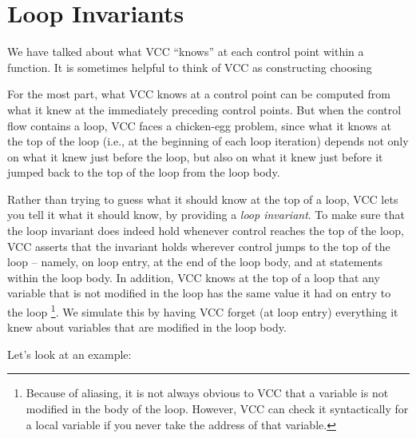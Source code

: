 \section{Loop Invariants}

We have talked about what VCC ``knows'' at each control point within a
function. It is sometimes helpful to think of VCC as constructing
choosing 


For the most part, what VCC knows at a control point can be
computed from what it knew at the immediately preceding control
points. But when the control flow contains a loop, VCC faces a
chicken-egg problem, since what it knows at the top of the loop (i.e.,
at the beginning of each loop iteration) depends not only on what it
knew just before the loop, but also on what it knew just before it
jumped back to the top of the loop from the loop body.

Rather than trying to guess what it should know at the top of a loop,
VCC lets you tell it what it should know, by providing a \emph{loop
  invariant}. To make sure that the loop invariant does indeed hold 
whenever control reaches the top
of the loop, VCC asserts that the invariant holds wherever control
jumps to the top of the loop -- namely, on loop entry, at the end of
the loop body, and at  statements within the loop body.
In addition, VCC knows at the top of a loop
that any variable that is not modified in the loop has 
the same value it had on entry to the loop%
\footnote{ Because of aliasing, it is not always obvious to VCC that a
  variable is not modified in the body of the loop. However, VCC can
  check it syntactically for a local variable if you never take the
  address of that variable.}. We simulate this by having VCC forget
(at loop entry) everything it knew about variables that are modified
in the loop body.

Let's look at an example:

